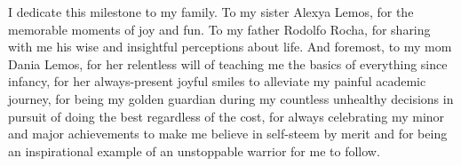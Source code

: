 I dedicate this milestone to my family. To my sister Alexya Lemos, for the memorable moments of joy and fun. To my father Rodolfo Rocha, for sharing with me his wise and insightful perceptions about life. And foremost, to my mom Dania Lemos, for her relentless will of teaching me the basics of everything since infancy, for her always-present joyful smiles to alleviate my painful academic journey, for being my golden guardian during my countless unhealthy decisions in pursuit of doing the best regardless of the cost, for always celebrating my minor and major achievements to make me believe in self-steem by merit and for being an inspirational example of an unstoppable warrior for me to follow.
